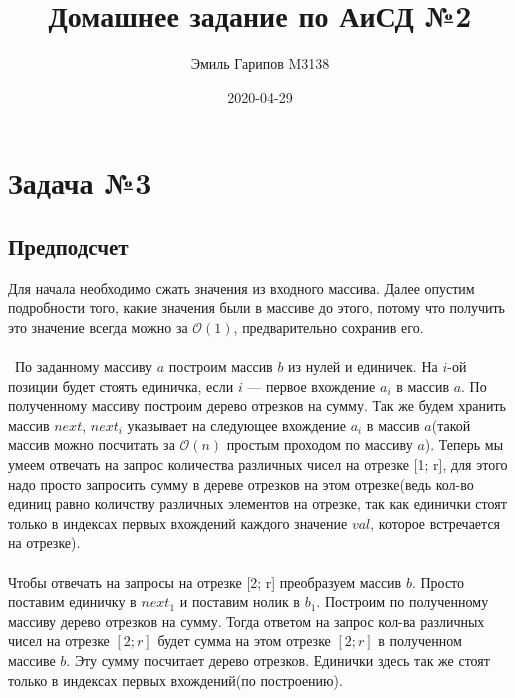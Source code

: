 \documentclass{article}
\title{Домашнее задание по АиСД №2}
\date{2020-04-29}
\author{Эмиль Гарипов M3138}
\begin{document}
\newcommand{\RomanNumeralCaps}[1]
{\MakeUppercase{\romannumeral #1}}


\maketitle
\newpage
{}

\section*{Задача №3}
\subsection*{Предподсчет}
Для начала необходимо сжать значения из входного массива. Далее опустим подробности того, какие значения были в массиве до этого, потому что получить это значение всегда можно за $\mathcal{O}(1)$, предварительно сохранив его.
\\\\\
По заданному массиву $a$ построим массив $b$ из нулей и единичек. На $i$-ой позиции будет стоять единичка, если $i$ --- первое вхождение $a_i$ в массив $a$. По полученному массиву построим дерево отрезков на сумму. Так же будем хранить массив $next$, $next_i$ указывает на следующее вхождение $a_i$ в массив $a$(такой массив можно посчитать за $\mathcal{O}(n)$ простым проходом по массиву $a$). Теперь мы умеем отвечать на запрос количества различных чисел на отрезке [1; r], для этого надо просто запросить сумму в дереве отрезков на этом отрезке(ведь кол-во единиц равно количству различных элементов на отрезке, так как единички стоят только в индексах первых вхождений каждого значение $val$, которое встречается на отрезке). 
\\\\
Чтобы отвечать на запросы на отрезке [2; r] преобразуем массив $b$. Просто поставим единичку в $next_1$ и поставим нолик в $b_1$. Построим по полученному массиву дерево отрезков на сумму. Тогда ответом на запрос кол-ва различных чисел на отрезке $[2; r]$ будет сумма на этом отрезке $[2; r]$ в полученном массиве $b$. Эту сумму посчитает дерево отрезков. Единички здесь так же стоят только в индексах первых вхождений(по построению).
\end{document}

